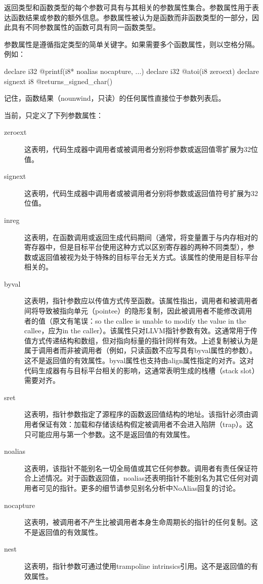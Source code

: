 \documentclass[12pt,a4paper]{article}
\begin{document}
返回类型和函数类型的每个参数可具有与其相关的参数属性集合。参数属性用于表达函数结果或参数的额外信息。参数属性被认为是函数而非函数类型的一部分，因此具有不同参数属性的函数可具有同一函数类型。

参数属性是遵循指定类型的简单关键字。如果需要多个函数属性，则以空格分隔。例如：

declare i32 @printf(i8* noalias nocapture, ...)
declare i32 @atoi(i8 zeroext)
declare signext i8 @returns\_signed\_char()

记住，函数结果（nounwind，只读）的任何属性直接位于参数列表后。

当前，只定义了下列参数属性：

\begin{description}
\item[zeroext] 这表明，代码生成器中调用者或被调用者分别将参数或返回值零扩展为32位值。
\item[signext] 这表明，代码生成器中调用者或被调用者分别将参数或返回值符号扩展为32位值。
\item[inreg] 这表明，在函数调用或返回生成代码期间（通常，将变量置于与内存相对的寄存器中，但是目标平台使用这种方式以区别寄存器的两种不同类型），参数或返回值被视为处于特殊的目标平台无关方式。该属性的使用是目标平台相关的。
\item[byval] 这表明，指针参数应以传值方式传至函数。该属性指出，调用者和被调用者间将导致被指向单元（pointee）的隐形复制，因此被调用者不能修改调用者的值（原文有笔误：so the callee is unable to modify the value in the callee，应为in the caller）。该属性只对LLVM指针参数有效。这通常用于传值方式传递结构和数组，但对指向标量的指针同样有效。上述复制被认为是属于调用者而非被调用者（例如，只读函数不应写具有byval属性的参数）。这不是返回值的有效属性。byval属性也支持由align属性指定的对齐。这对代码生成器有与目标平台相关的影响，这通常表明生成的栈槽（stack slot）需要对齐。
\item[sret] 这表明，指针参数指定了源程序的函数返回值结构的地址。该指针必须由调用者保证有效：加载和存储该结构假定被调用者不会进入陷阱（trap）。这只可能应用与第一个参数。这不是返回值的有效属性。
\item[noalias] 这表明，该指针不能别名一切全局值或其它任何参数。调用者有责任保证符合上述情况。对于函数返回值，noalias还表明指针不能别名为其它任何对调用者可见的指针。更多的细节请参见别名分析中NoAlias回复的讨论。
\item[nocapture] 这表明，被调用者不产生比被调用者本身生命周期长的指针的任何复制。这不是返回值的有效属性。
\item[nest] 这表明，指针参数可通过使用trampoline intrinsics引用。这不是返回值的有效属性。
\end{description}
\end{document}
